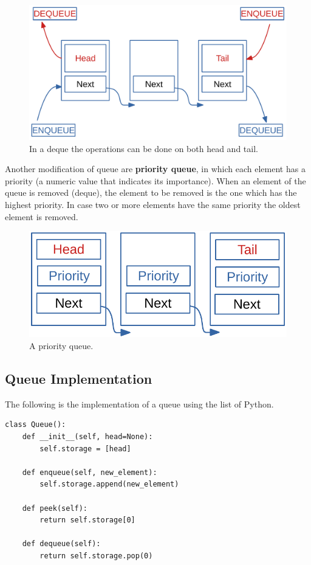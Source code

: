 \begin{figure}[H]
	\begin{center}
		\includegraphics[scale=.6]{chapters/datastructures/images/queue_2.pdf}
		\caption[In a deque the operations can be done on both head and tail.]{In a deque the operations can be done on both head and tail.}
		\label{queue_2}
	\end{center}
\end{figure}

Another modification of queue are \textbf{priority queue}, in which each element has a priority (a numeric value that indicates its importance). When an element of the queue is removed (deque), the element to be removed is the one which has the highest priority. In case two or more elements have the same priority the oldest element is removed.

\begin{figure}[H]
	\begin{center}
		\includegraphics[scale=.6]{chapters/datastructures/images/queue_3.pdf}
		\caption[A priority queue.]{A priority queue.}
		\label{queue_3}
	\end{center}
\end{figure}

\subsection{Queue Implementation}
The following is the implementation of a queue using the list of Python.
\begin{lstlisting}[firstnumber=1, caption={Queue implementation.}]
class Queue():
	def __init__(self, head=None):
		self.storage = [head]
	
	def enqueue(self, new_element):
		self.storage.append(new_element)
	
	def peek(self):
		return self.storage[0]
	
	def dequeue(self):
		return self.storage.pop(0)
\end{lstlisting}

